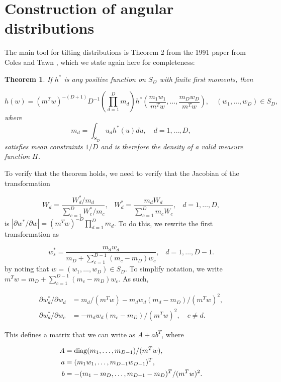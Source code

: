 \documentclass[10pt]{report}
\newtheorem{theorem}{Theorem}
\begin{document}
\section{Construction of angular distributions}
\label{sec:tilting}

The main tool for tilting distributions is Theorem 2 from the 1991 paper from Coles and Tawn \cite{ColesTawn}, which we state again here for completeness:\\


\begin{theorem}

If $h^*$ is any positive function on $S_D$ with finite first moments, then

$$
h(w) = (m^Tw)^{-(D+1)}D^{-1} \left( \prod_{d=1}^{D}m_d \right) h^*\left(\frac{m_1w_1}{m^Tw}, \ldots , \frac{m_Dw_D}{m^Tw}\right),
\quad (w_1,\ldots,w_D) \in S_D,
$$
where
$$
m_d = \int_{S_D} u_dh^*(u)du, \quad d=1, \ldots ,D,
$$
satisfies mean constraints $1/D$ and is therefore the density of a valid measure function $H$.

\end{theorem}

To verify that the theorem holds, we need to verify that the Jacobian of the transformation

$$
W_d = \dfrac{W^*_d/m_d}{\sum_{c=1}^{D}W_c^*/m_c},\hspace{10pt}
W_d^* = \frac{m_dW_d}{\sum_{c=1}^{D}m_cW_c},\hspace{10pt}
d=1,\ldots,D,
$$
is $|\partial w^*/\partial w | = (m^Tw)^{-D} \prod_{d=1}^{D}m_d$.
To do this, we rewrite the first transformation as

$$
w_s^* = \frac{m_dw_d}{m_D+\sum_{c=1}^{D-1}(m_c - m_D)w_c}, \hspace{10pt}
d=1,\ldots,D-1.
$$
by noting that $w=(w_1,\ldots,w_D) \in S_D$. To simplify notation, we write
$m^Tw = m_D + \sum_{c=1}^{D-1}(m_c - m_D)w_c$. As such,

\begin{align*}
\partial w_d^*/\partial w_d &= m_d/(m^Tw) - m_dw_d(m_d - m_D)/(m^Tw)^2 , \\
\partial w_d^*/\partial w_c &= - m_dw_d (m_c - m_D)/(m^Tw)^2, \quad c\neq d.
\end{align*}

This defines a matrix that we can write as $A + ab^T$, where

\begin{align*}
A &= {\rm diag}(m_1,\ldots,m_{D-1})/(m^Tw) , \\
a &= (m_1w_1,\ldots,m_{D-1}w_{D-1})^T , \\
b &= -(m_1 - m_D,\ldots,m_{D-1} - m_D)^T/(m^Tw)^2.
\end{align*}
\end{document}
